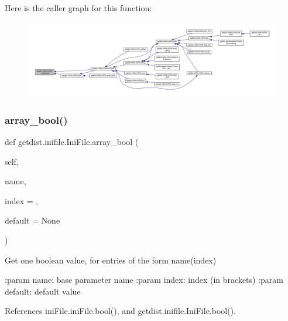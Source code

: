 Here is the caller graph for this function\+:
\nopagebreak
\begin{figure}[H]
\begin{center}
\leavevmode
\includegraphics[width=350pt]{classgetdist_1_1inifile_1_1IniFile_acf53cc236a011dff4c0dc416cd7fdd1c_icgraph}
\end{center}
\end{figure}
\mbox{\label{classgetdist_1_1inifile_1_1IniFile_aa3eae602ee8edc5f78f1cb63dbb8f138}} 
\subsubsection{\texorpdfstring{array\+\_\+bool()}{array\_bool()}}
{\footnotesize\ttfamily def getdist.\+inifile.\+Ini\+File.\+array\+\_\+bool (\begin{DoxyParamCaption}\item[{}]{self,  }\item[{}]{name,  }\item[{}]{index = {},  }\item[{}]{default = {\ttfamily None} }\end{DoxyParamCaption})}

\begin{DoxyVerb}Get one boolean value, for entries of the form name(index)

:param name: base parameter name
:param index: index (in brackets)
:param default: default value
\end{DoxyVerb}
 

References ini\+File.\+ini\+File.\+bool(), and getdist.\+inifile.\+Ini\+File.\+bool().


